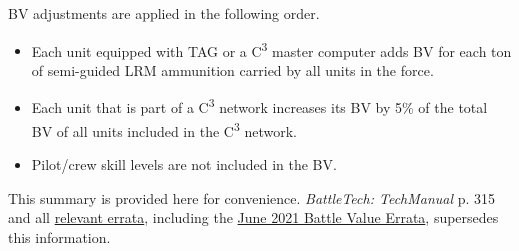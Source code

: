 BV adjustments are applied in the following order.

\begin{itemize}

\item Each unit equipped with TAG or a C\textsuperscript{3} master computer adds BV for each ton of semi-guided LRM ammunition carried by all units in the force.

\item Each unit that is part of a C\textsuperscript{3} network increases its BV by 5\% of the total BV of all units included in the C\textsuperscript{3} network.

\item Pilot/crew skill levels are not included in the BV.

\end{itemize}

This summary is provided here for convenience.
\emph{BattleTech: TechManual} p. 315 and all \href{https://bg.battletech.com/errata}{relevant errata}, including the \href{https://bg.battletech.com/wp-content/uploads/2021/06/TechManual-TM_BV4.1-Rev2021.pdf}{June 2021 Battle Value Errata}, supersedes this information.
